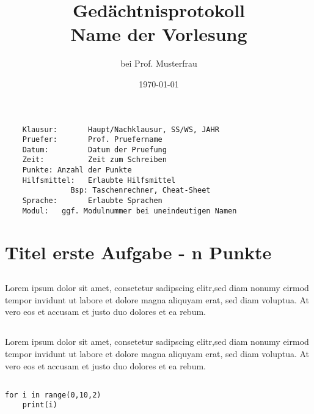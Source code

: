 \documentclass[a4paper]{article}
\begin{document}
	\author{bei Prof. Musterfrau\\}
	\title{\vspace{-2cm}Gedächtnisprotokoll\\Name der Vorlesung}
	\date{\today{}} 
	\maketitle{} %
	\vspace{-1cm}
	\begin{verbatim}
	Klausur:       Haupt/Nachklausur, SS/WS, JAHR
	Pruefer:       Prof. Pruefername
	Datum:         Datum der Pruefung
	Zeit:          Zeit zum Schreiben
	Punkte:	Anzahl der Punkte
	Hilfsmittel:   Erlaubte Hilfsmittel
		       Bsp: Taschenrechner, Cheat-Sheet
	Sprache:       Erlaubte Sprachen
	Modul:	 ggf. Modulnummer bei uneindeutigen Namen
	\end{verbatim}
	
	\section{Titel erste Aufgabe - n Punkte}
	\subsection{}
	Lorem ipsum dolor sit amet, consetetur sadipscing elitr,sed diam nonumy eirmod tempor invidunt ut labore et dolore magna aliquyam erat, sed diam voluptua.
	At vero eos et accusam et justo duo dolores et ea rebum.

	\subsection{}
	Lorem ipsum dolor sit amet, consetetur sadipscing elitr,sed diam nonumy eirmod tempor invidunt ut labore et dolore magna aliquyam erat, sed diam voluptua.
	At vero eos et accusam et justo duo dolores et ea rebum.
	\subsection{}
	\begin{verbatim}
for i in range(0,10,2)
	print(i)
	\end{verbatim}
\end{document}
